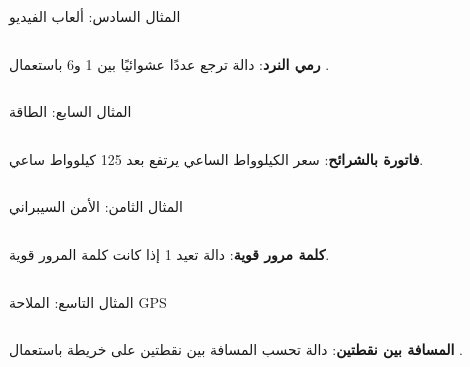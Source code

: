 \documentclass[aspectratio=169, 11pt, t, xcolor={table}]{beamer}
\begin{document}
\begin{frame}[t]{المثال السادس: ألعاب الفيديو}
    \begin{columns}[T]
        {\small \textbf{رمي النرد}: دالة ترجع عددًا عشوائيًا بين 1 و6 باستعمال .\par}
        \vspace{0.3cm}
    \end{columns}
\end{frame}

\begin{frame}[t]{المثال السابع: الطاقة}
    \begin{columns}[T]
        {\small \textbf{فاتورة بالشرائح}: سعر الكيلوواط الساعي يرتفع بعد 125 كيلوواط ساعي.\par}
        \vspace{0.3cm}
    \end{columns}
\end{frame}

\begin{frame}[t]{المثال الثامن: الأمن السيبراني}
    \begin{columns}[T]
        {\small \textbf{كلمة مرور قوية}: دالة تعيد 1 إذا كانت كلمة المرور قوية.\par}
        \vspace{0.3cm}
    \end{columns}
\end{frame}

\begin{frame}[t]{المثال التاسع: الملاحة \textenglish{GPS}}
    \begin{columns}[T]
        {\small \textbf{المسافة بين نقطتين}: دالة تحسب المسافة بين نقطتين على خريطة باستعمال .\par}
        \vspace{0.3cm}
    \end{columns}
\end{frame}
\end{document}
